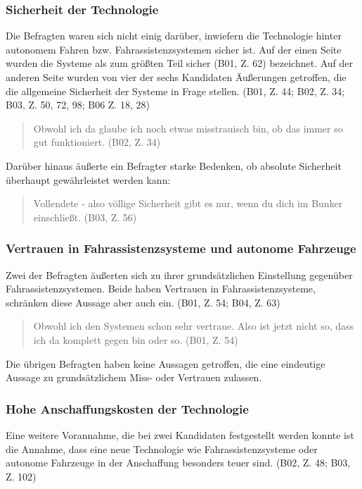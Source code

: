 \documentclass[12pt]{article}
\begin{document}
\subsubsection*{Sicherheit der Technologie}
Die Befragten waren sich nicht einig darüber, inwiefern die Technologie hinter autonomem Fahren bzw. Fahrassistenzsystemen sicher ist. Auf der einen Seite wurden die Systeme als \glqq zum größten Teil sicher\grqq{} (B01, Z. 62) bezeichnet. Auf der anderen Seite wurden von vier der sechs Kandidaten Äußerungen getroffen, die die allgemeine Sicherheit der Systeme in Frage stellen. (B01, Z. 44; B02, Z. 34; B03, Z. 50, 72, 98; B06 Z. 18, 28)
\begin{quote}
    Obwohl ich da glaube ich noch etwas misstrauisch bin, ob das immer so gut funktioniert. (B02, Z. 34)
\end{quote}

Darüber hinaus äußerte ein Befragter starke Bedenken, ob absolute Sicherheit überhaupt gewährleistet werden kann:
\begin{quote}
        Vollendete - also völlige Sicherheit gibt es nur, wenn du dich im Bunker einschließt. (B03, Z. 56)
\end{quote}

\subsubsection*{Vertrauen in Fahrassistenzsysteme und autonome Fahrzeuge}
Zwei der Befragten äußerten sich zu ihrer grundsätzlichen Einstellung gegenüber Fahrassistenzsystemen. Beide haben Vertrauen in Fahrassistenzsysteme, schränken diese Aussage aber auch ein. (B01, Z. 54; B04, Z. 63)

\begin{quote}
    Obwohl ich den Systemen schon sehr vertraue. Also ist jetzt nicht so, dass ich da komplett gegen bin oder so. (B01, Z. 54)
\end{quote}

Die übrigen Befragten haben keine Aussagen getroffen, die eine eindeutige Aussage zu grundsätzlichem Miss- oder Vertrauen zulassen.

\subsubsection*{Hohe Anschaffungskosten der Technologie}
Eine weitere Vorannahme, die bei zwei Kandidaten festgestellt werden konnte ist die Annahme, dass eine neue Technologie wie Fahrassistenzsysteme oder autonome Fahrzeuge in der Anschaffung besonders teuer sind. (B02, Z. 48; B03, Z. 102)
\end{document}
